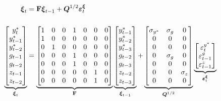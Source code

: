 \documentclass[a4paper,12pt]{article}
\begin{document}
\begin{align}
\boldsymbol{\xi }_{t}& =\mathbf{F}\boldsymbol{\xi }_{t-1}+\boldsymbol{Q}%
^{1/2}\boldsymbol{\varepsilon }_{t}^{\boldsymbol{\xi }}  \notag \\[5mm]
\underbrace{%
\begin{bmatrix}
y_{t}^{\ast } \\
y_{t-1}^{\ast } \\
y_{t-2}^{\ast } \\
g_{t-1} \\
g_{t-2} \\
z_{t-1} \\
z_{t-2}%
\end{bmatrix}%
}_{\boldsymbol{\xi }_{t}}& =\underbrace{%
\begin{bmatrix}
1 & 0 & 0 & 1 & 0 & 0 & 0 \\
1 & 0 & 0 & 0 & 0 & 0 & 0 \\
0 & 1 & 0 & 0 & 0 & 0 & 0 \\
0 & 0 & 0 & 1 & 0 & 0 & 0 \\
0 & 0 & 0 & 1 & 0 & 0 & 0 \\
0 & 0 & 0 & 0 & 0 & 1 & 0 \\
0 & 0 & 0 & 0 & 0 & 1 & 0%
\end{bmatrix}%
}_{\mathbf{F}}\underbrace{%
\begin{bmatrix}
y_{t-1}^{\ast } \\
y_{t-2}^{\ast } \\
y_{t-3}^{\ast } \\
g_{t-2} \\
g_{t-3} \\
z_{t-2} \\
z_{t-3}%
\end{bmatrix}%
}_{\boldsymbol{\xi }_{t-1}}+\underbrace{%
\begin{bmatrix}
\sigma _{y^{\ast }} & \sigma _{g} & 0 \\
0 & 0 & 0 \\
0 & 0 & 0 \\
0 & \sigma _{g} & 0 \\
0 & 0 & 0 \\
0 & 0 & \sigma _{z} \\
0 & 0 & 0%
\end{bmatrix}%
}_{\boldsymbol{Q}^{1/2}}\underbrace{%
\begin{bmatrix}
\varepsilon _{t}^{y^{\ast }} \\
\varepsilon _{t-1}^{g} \\
\varepsilon _{t-1}^{z}%
\end{bmatrix}%
}_{\boldsymbol{\varepsilon }_{t}^{\boldsymbol{\xi }}}  \label{state1}
\end{align}
\end{document}
